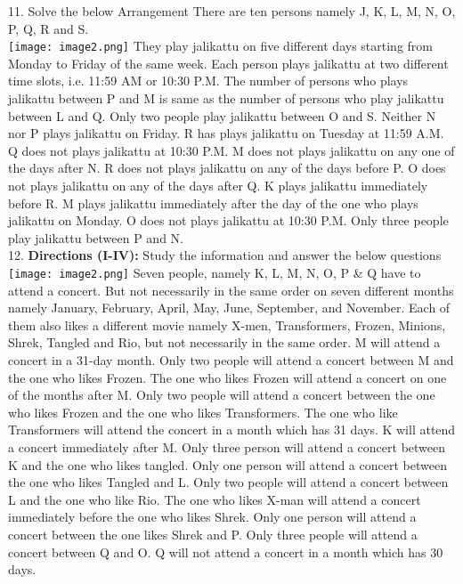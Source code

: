 \documentclass[
]{article}
\begin{document}
11. Solve the below Arrangement There are ten persons namely J, K, L, M, N, O, P, Q, R and S.\\
\texttt{[image: image2.png]}
They play jalikattu on five different days starting from Monday to Friday of the same week.
Each person plays jalikattu at two different time slots, i.e. 11:59 AM or 10:30 P.M. The
number of persons who plays jalikattu between P and M is same as the number of persons
who play jalikattu between L and Q. Only two people play jalikattu between O and S.
Neither N nor P plays jalikattu on Friday. R has plays jalikattu on Tuesday at 11:59 A.M. Q
does not plays jalikattu at 10:30 P.M. M does not plays jalikattu on any one of the days after
N. R does not plays jalikattu on any of the days before P. O does not plays jalikattu on any
of the days after Q. K plays jalikattu immediately before R. M plays jalikattu immediately
after the day of the one who plays jalikattu on Monday. O does not plays jalikattu at 10:30
P.M. Only three people play jalikattu between P and N.\\

12. \textbf{Directions (I-IV):} Study the information and answer the below questions\\
\texttt{[image: image2.png]}
Seven people,
namely K, L, M, N, O, P \& Q have to attend a concert. But not necessarily in the same order
on seven different months namely January, February, April, May, June, September, and
November. Each of them also likes a different movie namely X-men, Transformers, Frozen,
Minions, Shrek, Tangled and Rio, but not necessarily in the same order. M will attend a
concert in a 31-day month. Only two people will attend a concert between M and the one
who likes Frozen. The one who likes Frozen will attend a concert on one of the months after
M. Only two people will attend a concert between the one who likes Frozen and the one
who likes Transformers. The one who like Transformers will attend the concert in a month
which has 31 days. K will attend a concert immediately after M. Only three person will
attend a concert between K and the one who likes tangled. Only one person will attend a
concert between the one who likes Tangled and L. Only two people will attend a concert
between L and the one who like Rio. The one who likes X-man will attend a concert
immediately before the one who likes Shrek. Only one person will attend a concert between
the one likes Shrek and P. Only three people will attend a concert between Q and O. Q will
not attend a concert in a month which has 30 days.\\
\end{document}
